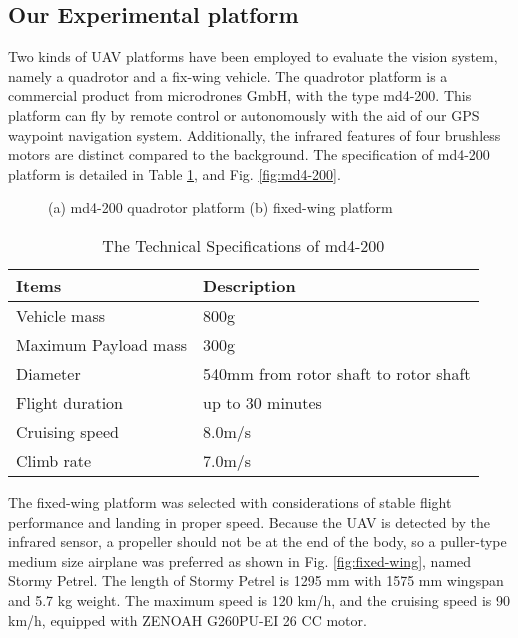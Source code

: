 \documentclass[letterpaper, 10 pt, conference]{ieeeconf}  %
\begin{document}
\subsection{Our Experimental platform}
Two kinds of UAV platforms have been employed to evaluate the vision system, namely a quadrotor and a fix-wing vehicle. The quadrotor platform is a commercial product from microdrones GmbH, with the type md4-200. This platform can fly by remote control or autonomously with the aid of our GPS waypoint navigation system. Additionally, the infrared features of four brushless motors are distinct compared to the background. The specification of md4-200 platform is detailed in Table \ref{tab:platform_specifications}, and Fig. \ref{fig:md4-200}.
   \begin{figure}[!tb]
      \centering
      \caption{(a) md4-200 quadrotor platform (b) fixed-wing platform}
   \end{figure}
   
  \begin{table}[!tb]
  \caption{The Technical Specifications of md4-200}
  \label{tab:platform_specifications}
  \begin{center}
  \renewcommand{\arraystretch}{1.1}
    \begin{tabular}{ll}
    \hline
    {\textbf Items}  & \textbf{Description} \\
    \hline
    Vehicle mass & 800g \\
    Maximum Payload mass &	300g \\
    Diameter & 540mm from rotor shaft to rotor shaft \\
    Flight duration & up to 30 minutes \\
    Cruising speed & 8.0m/s \\
    Climb rate & 7.0m/s \\
    \hline
    \end{tabular}
  \end{center}
  \end{table}
The fixed-wing platform was selected with considerations of stable flight performance and landing in proper speed. Because the UAV is detected by the infrared sensor, a propeller should not be at the end of the body, so a puller-type medium size airplane was preferred as shown in Fig. \ref{fig:fixed-wing}, named Stormy Petrel. The length of Stormy Petrel is 1295 mm with 1575 mm wingspan and 5.7 kg weight. The maximum speed is 120 km/h, and the cruising speed is 90 km/h, equipped with ZENOAH G260PU-EI 26 CC motor.
\end{document}
